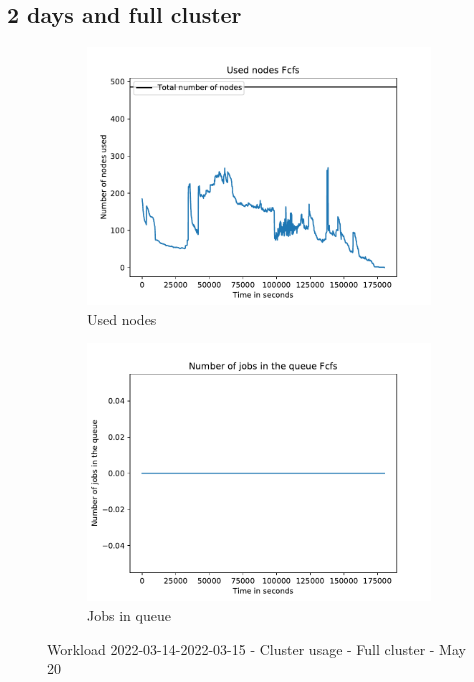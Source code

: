 \documentclass[a4paper]{article}
\begin{document}
	\subsection{2 days and full cluster}
	\begin{figure}[H]\centering
	\begin{subfigure}[b]{0.4\linewidth}\centering\includegraphics[width=1\linewidth]{MBSS/plot/2022-03-14->2022-03-15_Fcfs_Used_nodes_450_128_32_256_4_1024.pdf}\caption{Used nodes}\end{subfigure}
	\begin{subfigure}[b]{0.4\linewidth}\centering\includegraphics[width=1\linewidth]{MBSS/plot/2022-03-14->2022-03-15_Fcfs_Nb_scheduled_jobs_450_128_32_256_4_1024.pdf}\caption{Jobs in queue}\end{subfigure}
	\caption{Workload 2022-03-14-2022-03-15 - Cluster usage - Full cluster - May 20}\end{figure}
	
\end{document}
